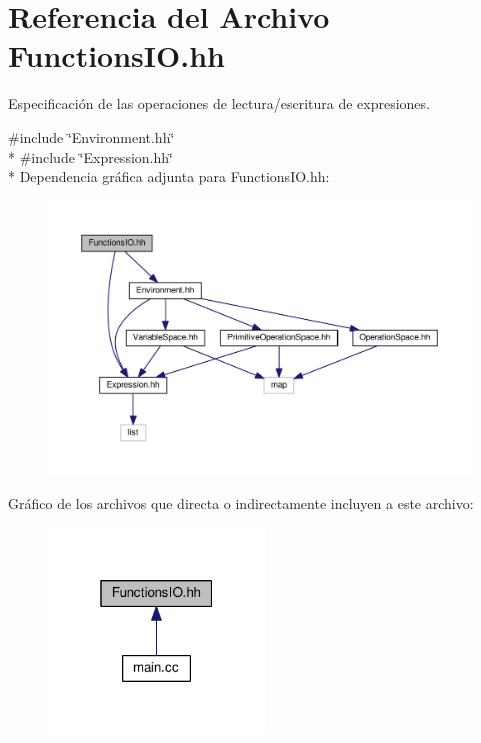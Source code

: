 \hypertarget{_functions_i_o_8hh}{}\section{Referencia del Archivo Functions\+I\+O.\+hh}
\label{_functions_i_o_8hh}


Especificación de las operaciones de lectura/escritura de expresiones.  


{\ttfamily \#include \char`\"{}Environment.\+hh\char`\"{}}\\*
{\ttfamily \#include \char`\"{}Expression.\+hh\char`\"{}}\\*
Dependencia gráfica adjunta para Functions\+I\+O.\+hh\+:\nopagebreak
\begin{figure}[H]
\begin{center}
\leavevmode
\includegraphics[width=350pt]{_functions_i_o_8hh__incl}
\end{center}
\end{figure}
Gráfico de los archivos que directa o indirectamente incluyen a este archivo\+:\nopagebreak
\begin{figure}[H]
\begin{center}
\leavevmode
\includegraphics[width=163pt]{_functions_i_o_8hh__dep__incl}
\end{center}
\end{figure}
